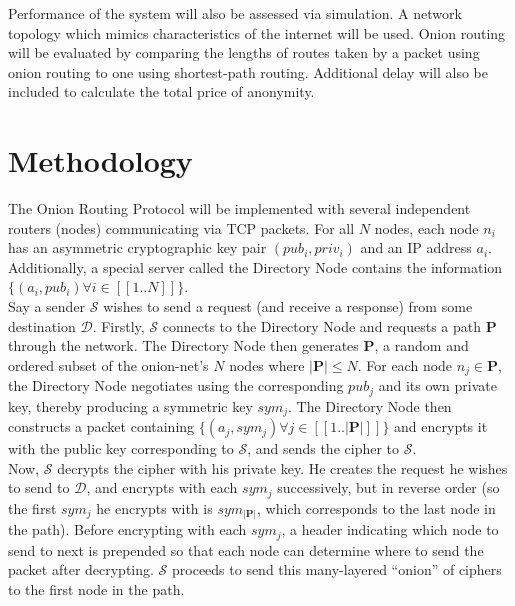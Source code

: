 \documentclass[10pt]{article}
\begin{document}

\noindent Performance of the system will also be assessed via simulation. A network topology which mimics characteristics of the internet will be used. Onion routing will be evaluated by comparing the lengths of routes taken by a packet using onion routing to one using shortest-path routing. Additional delay will also be included to calculate the total price of anonymity.

\section*{Methodology}

The Onion Routing Protocol will be implemented with several independent routers (nodes)
communicating via TCP packets.  For all $N$ nodes, each node $n_i$ has
an asymmetric cryptographic key pair $(pub_{i},priv_{i})$ and an IP address $a_i$.  Additionally, a special
server called the Directory Node contains the information $\{(a_i, pub_i) \forall i \in [\![1..N]\!]\}$.\\

\noindent Say a sender $\mathcal{S}$ wishes to send a request (and receive a response)
from some destination $\mathcal{D}$.  Firstly, $\mathcal{S}$ connects to the Directory Node
and requests a path $\mathbf{P}$ through the network. The Directory Node then generates
$\mathbf{P}$, a random and ordered subset of the onion-net's $N$ nodes where $|\mathbf{P}| \leq N$.  For each node
$n_j \in \mathbf{P}$, the Directory Node negotiates using the corresponding
$pub_j$ and its own private key, thereby producing a symmetric key $sym_j$.  The Directory
Node then constructs a packet containing $\{(a_j, sym_j) \forall j \in [\![1..|\mathbf{P}|]\!]\}$ and
encrypts it with the public key corresponding to $\mathcal{S}$, and sends the cipher to $\mathcal{S}$.\\

\noindent Now, $\mathcal{S}$ decrypts the cipher with his private key. He creates the
request he wishes to send to $\mathcal{D}$, and encrypts with each $sym_j$
successively, but in reverse order (so the first $sym_j$ he encrypts with is $sym_{|\mathbf{P}|}$, which corresponds
to the last node in the path). Before encrypting with each $sym_j$, a header
indicating which node to send to next is prepended so that each node can
determine where to send the packet after decrypting. $\mathcal{S}$ proceeds to
send this many-layered ``onion'' of ciphers to the first node in the path.\\
\end{document}
